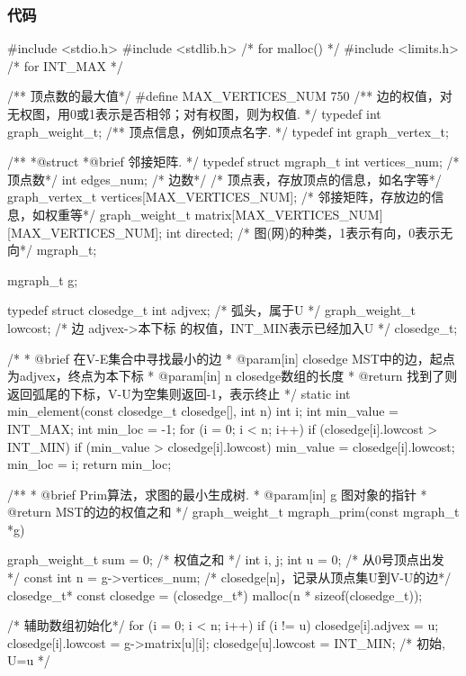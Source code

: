 \subsubsection{代码}
\begin{Codex}[label=poj_1751_highways_prim.c]
#include <stdio.h>
#include <stdlib.h>  /* for malloc() */
#include <limits.h>  /* for INT_MAX */

/** 顶点数的最大值*/
#define MAX_VERTICES_NUM 750
/** 边的权值，对无权图，用0或1表示是否相邻；对有权图，则为权值. */
typedef int graph_weight_t;
/** 顶点信息，例如顶点名字. */
typedef int graph_vertex_t;

/**
 *@struct
 *@brief 邻接矩阵.
 */
typedef struct mgraph_t {
    int vertices_num; /* 顶点数*/
    int edges_num; /* 边数*/
    /* 顶点表，存放顶点的信息，如名字等*/
    graph_vertex_t vertices[MAX_VERTICES_NUM];
    /* 邻接矩阵，存放边的信息，如权重等*/
    graph_weight_t matrix[MAX_VERTICES_NUM][MAX_VERTICES_NUM];
    int directed; /* 图(网)的种类，1表示有向，0表示无向*/
} mgraph_t;

mgraph_t g;

typedef struct closedge_t {
    int adjvex; /* 弧头，属于U */
    graph_weight_t lowcost; /* 边 adjvex->本下标 的权值，INT_MIN表示已经加入U */
} closedge_t;

/*
 * @brief 在V-E集合中寻找最小的边
 * @param[in] closedge MST中的边，起点为adjvex，终点为本下标
 * @param[in] n closedge数组的长度
 * @return 找到了则返回弧尾的下标，V-U为空集则返回-1，表示终止
 */
static int min_element(const closedge_t closedge[], int n) {
    int i;
    int min_value = INT_MAX;
    int min_loc = -1;
    for (i = 0; i < n; i++)
        if (closedge[i].lowcost > INT_MIN) {
            if (min_value > closedge[i].lowcost) {
                min_value = closedge[i].lowcost;
                min_loc = i;
            }
        }
    return min_loc;
}

/**
 * @brief Prim算法，求图的最小生成树.
 * @param[in] g 图对象的指针
 * @return MST的边的权值之和
 */
graph_weight_t mgraph_prim(const mgraph_t *g) {
    graph_weight_t sum = 0; /* 权值之和 */
    int i, j;
    int u = 0; /* 从0号顶点出发 */
    const int n = g->vertices_num;
    /* closedge[n]，记录从顶点集U到V-U的边*/
    closedge_t* const closedge = (closedge_t*) malloc(n * sizeof(closedge_t));

    /* 辅助数组初始化*/
    for (i = 0; i < n; i++) if (i != u) {
        closedge[i].adjvex = u;
        closedge[i].lowcost = g->matrix[u][i];
    }
    closedge[u].lowcost = INT_MIN; /* 初始, U={u} */

}
\end{Codex}
